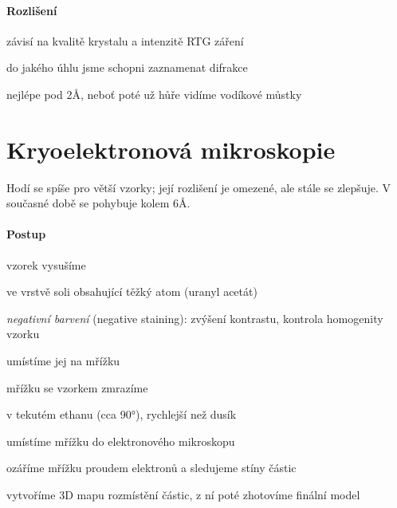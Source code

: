 \documentclass[DIV=8]{scrreprt}
\begin{document}
\paragraph{Rozlišení}
\begin{myItemize}[nosep]
    \item závisí na kvalitě krystalu a intenzitě RTG záření
    \item do jakého úhlu jsme schopni zaznamenat difrakce
    \item nejlépe pod 2Å, neboť poté už hůře vidíme vodíkové můstky
\end{myItemize}



\section{Kryoelektronová mikroskopie} \label{Kryoelektronová mikroskopie} \FloatBarrier


Hodí se spíše pro větší vzorky; její rozlišení je omezené, ale stále se zlepšuje. V současné době se pohybuje kolem 6Å.

\paragraph{Postup}
\begin{myEnumerate}[nosep]
    \item vzorek vysušíme
\begin{myItemize}[nosep]
    \item ve vrstvě soli obsahující těžký atom (uranyl acetát)
    \item \emph{negativní barvení} (negative staining): zvýšení kontrastu, kontrola homogenity vzorku
\end{myItemize}

    \item umístíme jej na mřížku
    \item mřížku se vzorkem zmrazíme
\begin{myItemize}[nosep]
    \item v tekutém ethanu (cca 90°), rychlejší než dusík
\end{myItemize}

    \item umístíme mřížku do elektronového mikroskopu
    \item ozáříme mřížku proudem elektronů a sledujeme stíny částic
    \item vytvoříme 3D mapu rozmístění částic, z ní poté zhotovíme finální model
\end{myEnumerate}
\end{document}
